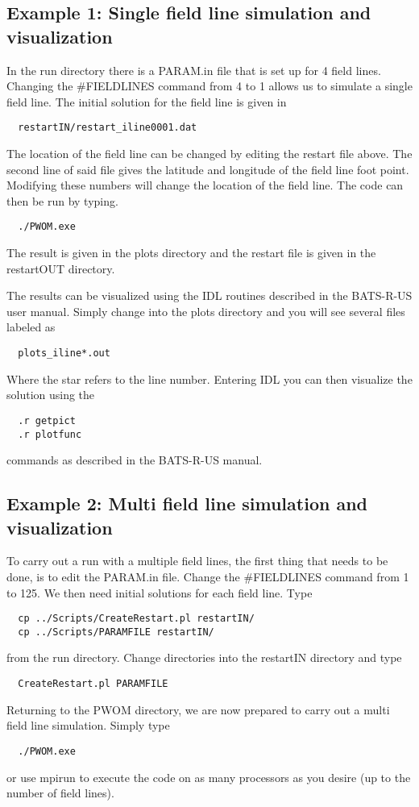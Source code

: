 \subsection{Example 1: Single field line simulation and visualization}
In the run directory there is a PARAM.in file that is set up for 4 
field lines. Changing the \#FIELDLINES command from 4 to 1 allows us to 
simulate a single field line. The initial solution for the field line 
is given in 
\begin{verbatim}
  restartIN/restart_iline0001.dat
\end{verbatim}
The location of the field line can be changed by editing the restart file 
above. The second line of said file gives the latitude and longitude of the 
field line foot point. Modifying these numbers will change the location of the 
field line. The code can then be run by typing. 
\begin{verbatim}
  ./PWOM.exe
\end{verbatim}
The result is given in the plots directory and the restart file is given in 
the restartOUT directory.

The results can be visualized using the IDL routines described in the 
BATS-R-US user manual. Simply change into the plots directory and you will see 
several files labeled as
\begin{verbatim}
  plots_iline*.out
\end{verbatim}
Where the star refers to the line number. Entering IDL you can then visualize 
the solution using the 
\begin{verbatim}
  .r getpict
  .r plotfunc
\end{verbatim}
commands as described in the BATS-R-US manual. 
\subsection{Example 2: Multi field line simulation and visualization}
To carry out a run with a multiple field lines, the first thing that 
needs to be done, is to edit the PARAM.in file. Change the \#FIELDLINES 
command 
from 1 to 125. We then need initial solutions for each field line. Type
\begin{verbatim}
  cp ../Scripts/CreateRestart.pl restartIN/
  cp ../Scripts/PARAMFILE restartIN/
\end{verbatim}
from the run directory. Change directories into the restartIN directory and 
type
\begin{verbatim}
  CreateRestart.pl PARAMFILE
\end{verbatim}
Returning to the PWOM directory, we are now prepared to carry out a multi field 
line simulation. Simply type 
\begin{verbatim}
  ./PWOM.exe
\end{verbatim}
or use mpirun to execute the code on as many processors as you desire (up to 
the number of field lines).

